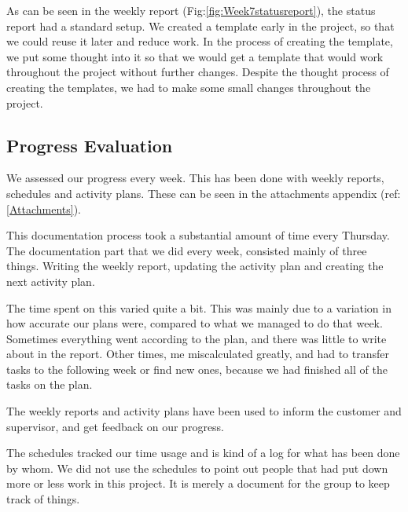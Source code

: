     As can be seen in the weekly report (Fig:\ref{fig:Week7statusreport}), the status report had a standard setup. We created a template early in the project, so that we could reuse it later and reduce work. In the process of creating the template, we put some thought into it so that we would get a template that would work throughout the project without further changes. Despite the thought process of creating the templates, we had to make some small changes throughout the project.
    
       \subsection{Progress Evaluation}\label{Progress Evaluation}
    We assessed our progress every week. This has been done with weekly reports, schedules and activity plans. These can be seen in the attachments appendix (ref:\ref{Attachments}).
    
    This documentation process took a substantial amount of time every Thursday. The documentation part that we did every week, consisted mainly of three things. Writing the weekly report, updating the activity plan and creating the next activity plan. 
    
    The time spent on this varied quite a bit. This was mainly due to a variation in how accurate our plans were, compared to what we managed to do that week. Sometimes everything went according to the plan, and there was little to write about in the report. Other times, me miscalculated greatly, and had to transfer tasks to the following week or find new ones, because we had finished all of the tasks on the plan.
    
    The weekly reports and activity plans have been used to inform the customer and supervisor, and get feedback on our progress.
    
    The schedules tracked our time usage and is kind of a log for what has been done by whom. We did not use the schedules to point out people that had put down more or less work in this project. It is merely a document for the group to keep track of things. 
    
    
